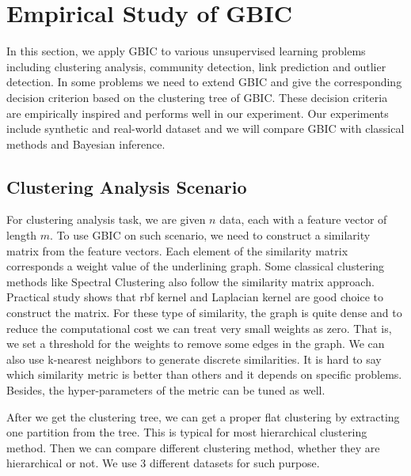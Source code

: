 \section{Empirical Study of GBIC}\label{sec:es}
In this section, we apply GBIC to various unsupervised learning problems including clustering analysis, community detection, link prediction and outlier detection.
In some problems we need to extend GBIC and give the corresponding decision criterion based on the clustering tree of GBIC.
These decision criteria are empirically inspired and performs well in our experiment. Our experiments
include synthetic and real-world dataset and we will compare GBIC with classical methods and Bayesian inference.

\subsection{Clustering Analysis Scenario}\label{subsec:dc}
For clustering analysis task, we are given $n$ data, each with a feature vector of length $m$.
To use GBIC on such scenario, we need to construct a similarity matrix from the feature vectors. Each element of the similarity matrix corresponds a weight value of the underlining graph. Some classical clustering methods like Spectral Clustering also follow the similarity matrix approach. Practical study shows that rbf kernel and Laplacian kernel are good choice to construct the matrix.
For these type of similarity, the graph is quite dense and to reduce the computational cost we can treat very small weights as zero. That is, we set a threshold for the weights to remove some edges in the graph. We can also use k-nearest neighbors to generate discrete similarities. It is hard to say which similarity metric is better than others and it depends on specific problems. Besides, the hyper-parameters of the metric can be tuned as well.

After we get the clustering tree, we can get a proper flat clustering by extracting one partition from the tree. This is typical for most hierarchical clustering method. Then we can compare different clustering method, whether they are hierarchical or not. We use 3 different datasets for such purpose.

